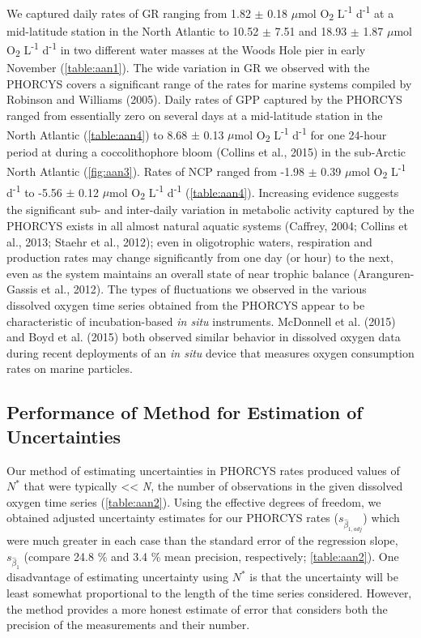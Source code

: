 We captured daily rates of GR ranging from 1.82 $\pm$ 0.18 $\mu$mol O\textsubscript{2} L\textsuperscript{-1} d\textsuperscript{-1} at a mid-latitude station in the North Atlantic to 10.52 $\pm$ 7.51 and 18.93 $\pm$ 1.87 $\mu$mol O\textsubscript{2} L\textsuperscript{-1} d\textsuperscript{-1} in two different water masses at the Woods Hole pier in early November (\autoref{table:aan1}). The wide variation in GR we observed with the PHORCYS covers a significant range of the rates for marine systems compiled by Robinson and Williams (2005). Daily rates of GPP captured by the PHORCYS ranged from essentially zero on several days at a mid-latitude station in the North Atlantic (\autoref{table:aan4}) to 8.68 $\pm$ 0.13 $\mu$mol O\textsubscript{2} L\textsuperscript{-1} d\textsuperscript{-1} for one 24-hour period at during a coccolithophore bloom (Collins et al., 2015) in the sub-Arctic North Atlantic (\autoref{fig:aan3}). Rates of NCP ranged from -1.98 $\pm$ 0.39 $\mu$mol O\textsubscript{2} L\textsuperscript{-1} d\textsuperscript{-1} to -5.56 $\pm$ 0.12 $\mu$mol O\textsubscript{2} L\textsuperscript{-1} d\textsuperscript{-1} (\autoref{table:aan4}). Increasing evidence suggests the significant sub- and inter-daily variation in metabolic activity captured by the PHORCYS exists in all almost natural aquatic systems (Caffrey, 2004; Collins et al., 2013; Staehr et al., 2012); even in oligotrophic waters, respiration and production rates may change significantly from one day (or hour) to the next, even as the system maintains an overall state of near trophic balance (Aranguren-Gassis et al., 2012). The types of fluctuations we observed in the various dissolved oxygen time series obtained from the PHORCYS appear to be characteristic of incubation-based \emph{in situ} instruments. McDonnell et al. (2015) and Boyd et al. (2015) both observed similar behavior in dissolved oxygen data during recent deployments of an \emph{in situ} device that measures oxygen consumption rates on marine particles.
\subsection{Performance of Method for Estimation of Uncertainties}
Our method of estimating uncertainties in PHORCYS rates produced values of $N^*$ that were typically \textless{}\textless{} \emph{N}, the number of observations in the given dissolved oxygen time series (\autoref{table:aan2}). Using the effective degrees of freedom, we obtained adjusted uncertainty estimates for our PHORCYS rates (${s_{{{\hat \beta }_{1,adj}}}}$) which were much greater in each case than the standard error of the regression slope, ${s_{{{\hat \beta }_{1}}}}$ (compare 24.8 \% and 3.4 \% mean precision, respectively; \autoref{table:aan2}). One disadvantage of estimating uncertainty using $N^*$ is that the uncertainty will be least somewhat proportional to the length of the time series considered. However, the method provides a more honest estimate of error that considers both the precision of the measurements and their number.
